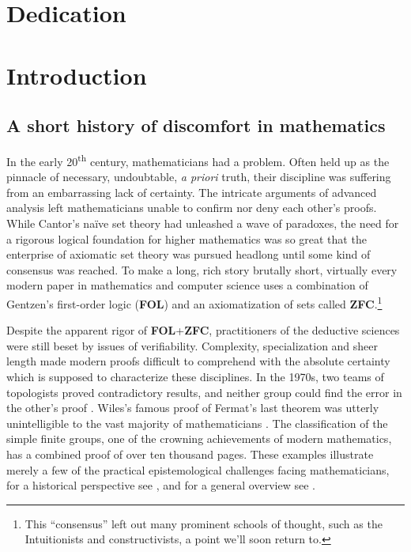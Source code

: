 \documentclass[12pt,twoside,draft]{reedthesis}
\makeatletter
\let\oldindex\index
\renewcommand{\index}[1]{\oldindex{#1}\marginpar{\footnotesize\color{index}index: #1}}
\newcommand{\indeX}[1]{\oldindex{#1}}
\newcommand{\abbreviation}[1]{\textbf{#1}\indeX{#1@\textbf{#1}}} %
\makeatother
\begin{document}
\chapter*{Dedication}

\mainmatter %
\pagestyle{fancyplain} %

\chapter*{Introduction}

\section*{A short history of discomfort in mathematics}


In the early 20\textsuperscript{th} century, mathematicians had a problem. Often
held up as the pinnacle of necessary, undoubtable, \textit{a priori} truth,
their discipline was suffering from an embarrassing lack of certainty. The
intricate arguments of advanced analysis left mathematicians unable to confirm
nor deny each other's proofs. While Cantor's na\"ive set theory had unleashed a
wave of paradoxes, the need for a rigorous logical foundation for higher
mathematics was so great that the enterprise of axiomatic set theory was pursued
headlong until some kind of consensus was reached. To make a long, rich story
brutally short, virtually every modern paper in mathematics and computer
science uses a combination of Gentzen's first-order logic (\abbreviation{FOL})
and an axiomatization of sets called
\abbreviation{ZFC}.\footnote{This ``consensus'' left out many
  prominent schools of thought, such as the Intuitionists and constructivists, a
  point we'll soon return to.}

Despite the apparent rigor of \abbreviation{FOL}+\abbreviation{ZFC},
practitioners of the deductive sciences were still beset by issues of
verifiability. Complexity, specialization and sheer length made modern proofs
difficult to comprehend with the absolute certainty which is supposed to
characterize these disciplines. In the 1970s, two teams of topologists proved
contradictory results, and neither group could find the error in the other's
proof \cite{kolata}. Wiles's famous proof of Fermat's last theorem was utterly
unintelligible to the vast majority of mathematicians \cite{nyt}. The
classification of the simple finite groups, one of the crowning achievements of
modern mathematics, has a combined proof of over ten thousand pages. These
examples illustrate merely a few of the practical epistemological challenges
facing mathematicians, for a historical perspective see \cite{rigor-and-proof},
and for a general overview see \cite{fidelity}.
\end{document}

